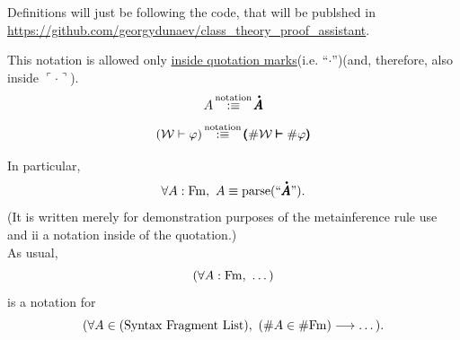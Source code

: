 Definitions will just be following the code, that will be publshed in \url{https://github.com/georgydunaev/class_theory_proof_assistant}.


\iffalse %
\begin{constructor}[Henkin constructor]%

For any bounded by term formula $\kappa$, $h_{\kappa}$ is a term.
\[
h:\BoundFm\to\Class
\]
\[
\kappa \mapsto h_\kappa
\]
\end{constructor}
\fi

\iffalse GOOD BUT IT COMPLICATES THE SYSTEM
\begin{definition}[$\vdash$]%
Inference in language is denoted with function $\vdash$.
\[
(\vdash\,: \Fm \to \Bool)
\]

\end{definition}
\fi


\begin{metanotation}
This notation is allowed only \underline{inside quotation marks}(i.e. ``$\cdot$'')(and, therefore, also inside $\ulcorner\cdot\urcorner$).
\[
A \equivnot {\antiquote{\pmb{A}}}
\]
\[
({\mathcal{W}} \vdash \varphi) \,{\stackrel{{\textrm{notation}}}{:\equiv}}\, \pmb{(}\#{\mathcal{W}} \pmb{\vdash} \#\varphi\pmb{)}
\]
\end{metanotation}
\begin{example}
In particular,%
\[
\forall A : \Fm,\ A \equiv \myparse{(\myquote{\antiquote{\pmb{A}}})}.
\]
(It is written merely for demonstration purposes of the metainference rule use and ii a notation inside of the quotation.)\\
As usual, 
\[
(\forall A : \mathrm{Fm},\ \dots )
\]
is a notation for
\[
(\forall A\in(\text{Syntax Fragment List}),\ (\#A\in \#\mathrm{Fm})\longrightarrow \dots).
\] 
\end{example}
\fi %

